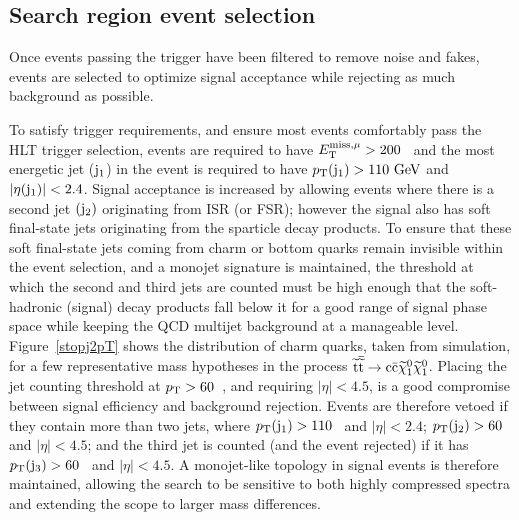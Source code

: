 \subsection{Search region event selection}

Once events passing the trigger have been filtered to remove noise and fakes, 
events are selected to optimize signal acceptance while rejecting as much background as possible.

To satisfy trigger requirements, and ensure most events comfortably pass the \ac{HLT} trigger selection, 
events are required to have $E^{\rm miss, \mu}_{\rm T} > 200$~\GeV{} and the most energetic jet (${\rm j}_1$) in the event is required 
to have $p_{\text{T}}({\rm j}_1)>110~\mathrm{GeV}$ and $|\eta({\rm j}{}_1)|<2.4$.
Signal acceptance is increased by allowing events where there is a second jet $({\rm j}_2)$ originating from \ac{ISR} (or \ac{FSR}); 
however the signal also has soft final-state jets originating from the sparticle decay products.
%
To ensure that these soft final-state jets coming from charm or bottom quarks remain invisible within the event selection,
%
and a monojet signature is maintained,
the \pt{} threshold at which the second and third jets are counted must be high enough that
the soft-hadronic (signal) decay products 
fall below it for a good range of signal phase space 
while keeping the QCD multijet background at a manageable level.
%
Figure~\ref{stopj2pT} shows the \pt{} distribution of charm quarks, taken from simulation, 
for a few representative mass hypotheses in the process $\widetilde{{\rm t}} \overline{\widetilde{\mathrm{t}}} \rightarrow \rm c \bar{\rm c} \widetilde{\chi}^{0}_{1} \widetilde{\chi}^{0}_{1}$.
%
Placing the jet counting threshold at $p_{\text{T}} >60$~\GeV, and requiring $|\eta| < 4.5$,
is a good compromise between signal efficiency and background rejection.
%
Events are therefore vetoed if they contain more than two jets,
where $p_{\text{T}}({\rm j}_{1})>110$~\GeV{} and $|\eta|<2.4$; $p_{\text{T}}({\rm j}_{2})>60$~\GeV{} and $|\eta|<4.5$; 
and the third jet is counted (and the event rejected) if it has $p_{\text{T}}({\rm j}_{3})>60$~\GeV{} and $|\eta|<4.5$.
A monojet-like topology in signal events is therefore maintained, 
allowing the search to be sensitive to both highly compressed spectra
and extending the scope to larger mass differences.  

